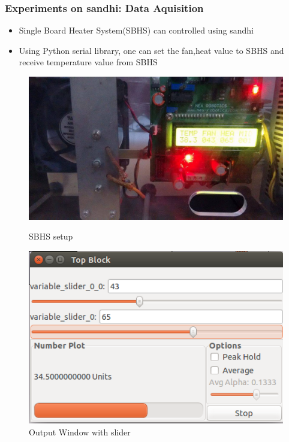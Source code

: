 \documentclass{beamer}
\begin{document}
\begin{frame}
        \frametitle{Experiments on sandhi: Data Aquisition}
        \begin{itemize}
	\item Single Board Heater System(SBHS) can controlled using sandhi
	\item Using Python serial library, one can set the fan,heat value to SBHS and receive temperature value from SBHS
        \end{itemize}
\begin{figure}
        \centering
        \begin{minipage}{.5\textwidth}
            \centering
            \includegraphics[width=.7\linewidth]{sbhs.jpg}
            \caption{SBHS setup}
        \end{minipage}%
        \begin{minipage}{.5\textwidth}
            \centering
            \includegraphics[width=.7\linewidth]{sbhs_img.png}
            \caption{Output Window with slider}
        \end{minipage}
    \end{figure}
\end{frame}
\end{document}
